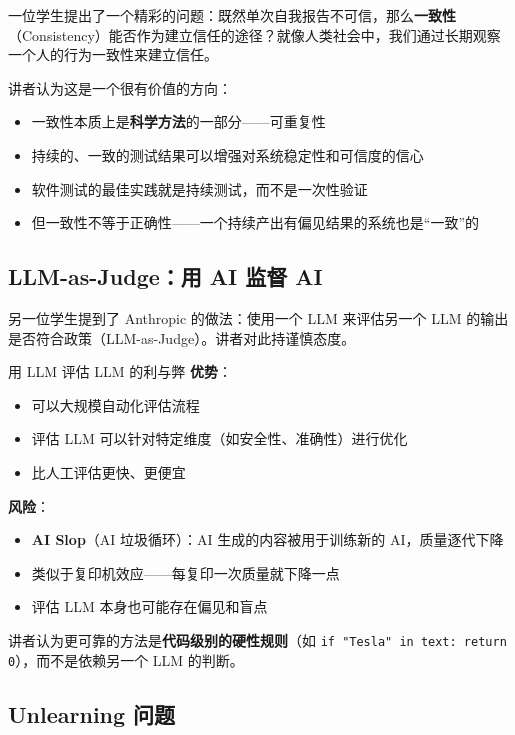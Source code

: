 一位学生提出了一个精彩的问题：既然单次自我报告不可信，那么\textbf{一致性}（Consistency）能否作为建立信任的途径？就像人类社会中，我们通过长期观察一个人的行为一致性来建立信任。

讲者认为这是一个很有价值的方向：

\begin{itemize}
    \item 一致性本质上是\textbf{科学方法}的一部分——可重复性
    \item 持续的、一致的测试结果可以增强对系统稳定性和可信度的信心
    \item 软件测试的最佳实践就是持续测试，而不是一次性验证
    \item 但一致性不等于正确性——一个持续产出有偏见结果的系统也是``一致''的
\end{itemize}

\subsection{LLM-as-Judge：用 AI 监督 AI}

另一位学生提到了 Anthropic 的做法：使用一个 LLM 来评估另一个 LLM 的输出是否符合政策（LLM-as-Judge）。讲者对此持谨慎态度。

\begin{knowledgebox}{用 LLM 评估 LLM 的利与弊}
\textbf{优势}：
\begin{itemize}
    \item 可以大规模自动化评估流程
    \item 评估 LLM 可以针对特定维度（如安全性、准确性）进行优化
    \item 比人工评估更快、更便宜
\end{itemize}
\textbf{风险}：
\begin{itemize}
    \item \textbf{AI Slop}（AI 垃圾循环）：AI 生成的内容被用于训练新的 AI，质量逐代下降
    \item 类似于复印机效应——每复印一次质量就下降一点
    \item 评估 LLM 本身也可能存在偏见和盲点
\end{itemize}
讲者认为更可靠的方法是\textbf{代码级别的硬性规则}（如 \texttt{if "Tesla" in text: return 0}），而不是依赖另一个 LLM 的判断。
\end{knowledgebox}

\subsection{Unlearning 问题}

